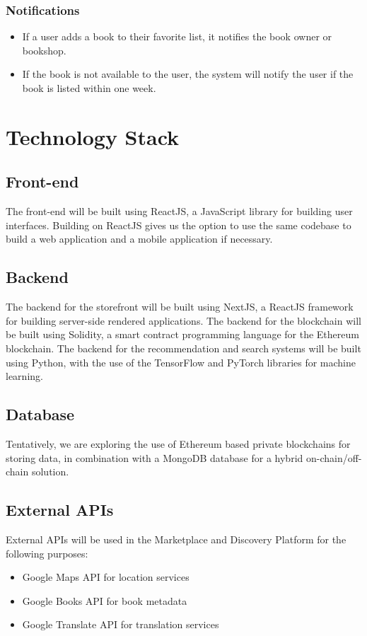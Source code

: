\subsubsection{Notifications}
\begin{itemize}
  \item If a user adds a book to their favorite list, it notifies the book owner or bookshop.
  \item If the book is not available to the user, the system will notify the user if the book is listed within one week.
\end{itemize}

\section{Technology Stack}

\subsection{Front-end}
The front-end will be built using ReactJS, a JavaScript library for building user interfaces. Building on
ReactJS gives us the option to use the same codebase to build a web application and a mobile application
if necessary.

\subsection{Backend}
The backend for the storefront will be built using NextJS, a ReactJS framework for building server-side
rendered applications. The backend for the blockchain will be built using Solidity, a smart contract
programming language for the Ethereum blockchain. The backend for the recommendation and search systems
will be built using Python, with the use of the TensorFlow and PyTorch libraries for machine learning.

\subsection{Database}
Tentatively, we are exploring the use of Ethereum based private blockchains for storing data, in combination
with a MongoDB database for a hybrid on-chain/off-chain solution. 

\subsection{External APIs}
External APIs will be used in the Marketplace and Discovery Platform for the following purposes:
\begin{itemize}
  \item Google Maps API for location services
  \item Google Books API for book metadata
  \item Google Translate API for translation services
\end{itemize}

